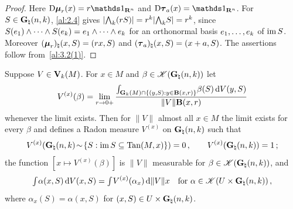 \begin{proof}
    Here $\uD \scale{r}(x) = r \id{\R^{\adim}}$ and $\uD \trans{a}(x) = \id{\R^{\adim}}$. For $S
    \in \mathbf{G}_{\natural}(n,k)$, \ref{al:2.4} gives $|{\textstyle\boldsymbol{\bigwedge}}_{{k}}(r S)| = r^{k}
    |{\textstyle\boldsymbol{\bigwedge}}_{{k}} S| = r^{k}$, since $S(e_1) \wedge \cdots \wedge S(e_{k}) = e_1 \wedge
    \cdots \wedge e_{k}$ for an orthonormal basis $e_1, \ldots, e_{k}$ of $\operatorname{im} S$.
    Moreover $(\boldsymbol{\mu}_{r})_\natural(x,S) = (r x, S)$ and $(\boldsymbol{\tau}_{a})_\natural(x,S) = (x + a, S)$.
    The assertions follow from~\ref{al:3.2(1)}.
\end{proof}

\begin{theorem}
    \label{al:3.3}
    Suppose $V \in \mathbf{V}_{k}(M)$. For $x \in M$ and $\beta \in \mathscr{K}(\mathbf{G}_{\natural}(n,k))$
    let
    \begin{displaymath}
        V^{(x)}(\beta) = \lim_{r \to 0+} \frac{{\textstyle\int_{\mathbf{G}_{k}(M) \cap \{ (y,S) : y \in \mathbf{B}(x,r)
        \}}^{}} \beta(S) \,\mathrm{d} V(y,S)}{\|V\| \mathbf{B}(x,r)}
    \end{displaymath}
    whenever the limit exists. Then for $\|V\|$ almost all $x \in M$ the limit exists for every
    $\beta$ and defines a Radon measure $V^{(x)}$ on $\mathbf{G}_{\natural}(n,k)$ such that
    \begin{displaymath}
        V^{(x)}(\mathbf{G}_{\natural}(n,k) \!\sim\! \{ S : \operatorname{im} S \subseteq \operatorname{Tan}(M,x) \}) = 0 \,, \qquad
        V^{(x)}(\mathbf{G}_{\natural}(n,k)) = 1 \,;
    \end{displaymath}
    the function $[x \mapsto V^{(x)}(\beta)]$ is $\|V\|$ measurable for $\beta \in
    \mathscr{K}(\mathbf{G}_{\natural}(n,k))$, and
    \begin{displaymath}
        {\textstyle\int_{}^{}} \alpha(x,S) \,\mathrm{d} V(x,S) = {\textstyle\int_{}^{}} V^{(x)}(\alpha_x) \,\mathrm{d} \|V\| x \quad
        \text{for $\alpha \in \mathscr{K}(U \times \mathbf{G}_{\natural}(n,k))$} \,,
    \end{displaymath}
    where $\alpha_x(S) = \alpha(x,S)$ for $(x,S) \in U \times \mathbf{G}_{\natural}(n,k)$.
\end{theorem}

